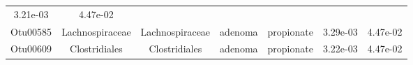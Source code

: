 \documentclass[11pt,]{article}
\begin{document}
\begin{longtable}[]{@{}ccccccc@{}}
\begin{minipage}[t]{0.09\columnwidth}
3.21e-03\strut
\end{minipage} & \begin{minipage}[t]{0.09\columnwidth}\centering\strut
4.47e-02\strut
\end{minipage}\tabularnewline
\begin{minipage}[t]{0.09\columnwidth}\centering\strut
Otu00585\strut
\end{minipage} & \begin{minipage}[t]{0.17\columnwidth}\centering\strut
Lachnospiraceae\strut
\end{minipage} & \begin{minipage}[t]{0.17\columnwidth}\centering\strut
Lachnospiraceae\strut
\end{minipage} & \begin{minipage}[t]{0.09\columnwidth}\centering\strut
adenoma\strut
\end{minipage} & \begin{minipage}[t]{0.11\columnwidth}\centering\strut
propionate\strut
\end{minipage} & \begin{minipage}[t]{0.09\columnwidth}\centering\strut
3.29e-03\strut
\end{minipage} & \begin{minipage}[t]{0.09\columnwidth}\centering\strut
4.47e-02\strut
\end{minipage}\tabularnewline
\begin{minipage}[t]{0.09\columnwidth}\centering\strut
Otu00609\strut
\end{minipage} & \begin{minipage}[t]{0.17\columnwidth}\centering\strut
Clostridiales\strut
\end{minipage} & \begin{minipage}[t]{0.17\columnwidth}\centering\strut
Clostridiales\strut
\end{minipage} & \begin{minipage}[t]{0.09\columnwidth}\centering\strut
adenoma\strut
\end{minipage} & \begin{minipage}[t]{0.11\columnwidth}\centering\strut
propionate\strut
\end{minipage} & \begin{minipage}[t]{0.09\columnwidth}\centering\strut
3.22e-03\strut
\end{minipage} & \begin{minipage}[t]{0.09\columnwidth}\centering\strut
4.47e-02\strut
\end{minipage}\tabularnewline

\end{longtable}
\end{document}
